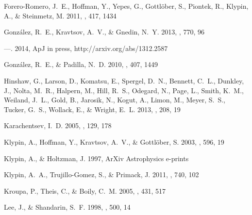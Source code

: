 \documentclass{emulateapj}
\begin{document}
\begin{thebibliography}{38}
{Forero-Romero}, J.~E., {Hoffman}, Y., {Yepes}, G., {Gottl{\"o}ber}, S.,
  {Piontek}, R., {Klypin}, A., \& {Steinmetz}, M. 2011, \mnras, 417, 1434

{Gonz{\'a}lez}, R.~E., {Kravtsov}, A.~V., \& {Gnedin}, N.~Y. 2013, \apj, 770,
  96

---. 2014, ApJ in press, http://arxiv.org/abs/1312.2587

{Gonz{\'a}lez}, R.~E., \& {Padilla}, N.~D. 2010, \mnras, 407, 1449

{Hinshaw}, G., {Larson}, D., {Komatsu}, E., {Spergel}, D.~N., {Bennett}, C.~L.,
  {Dunkley}, J., {Nolta}, M.~R., {Halpern}, M., {Hill}, R.~S., {Odegard}, N.,
  {Page}, L., {Smith}, K.~M., {Weiland}, J.~L., {Gold}, B., {Jarosik}, N.,
  {Kogut}, A., {Limon}, M., {Meyer}, S.~S., {Tucker}, G.~S., {Wollack}, E., \&
  {Wright}, E.~L. 2013, \apjs, 208, 19

{Karachentsev}, I.~D. 2005, \aj, 129, 178

{Klypin}, A., {Hoffman}, Y., {Kravtsov}, A.~V., \& {Gottl{\"o}ber}, S. 2003,
  \apj, 596, 19

{Klypin}, A., \& {Holtzman}, J. 1997, ArXiv Astrophysics e-prints

{Klypin}, A.~A., {Trujillo-Gomez}, S., \& {Primack}, J. 2011, \apj, 740, 102

{Kroupa}, P., {Theis}, C., \& {Boily}, C.~M. 2005, \aap, 431, 517

{Lee}, J., \& {Shandarin}, S.~F. 1998, \apj, 500, 14


\end{thebibliography}
\end{document}
